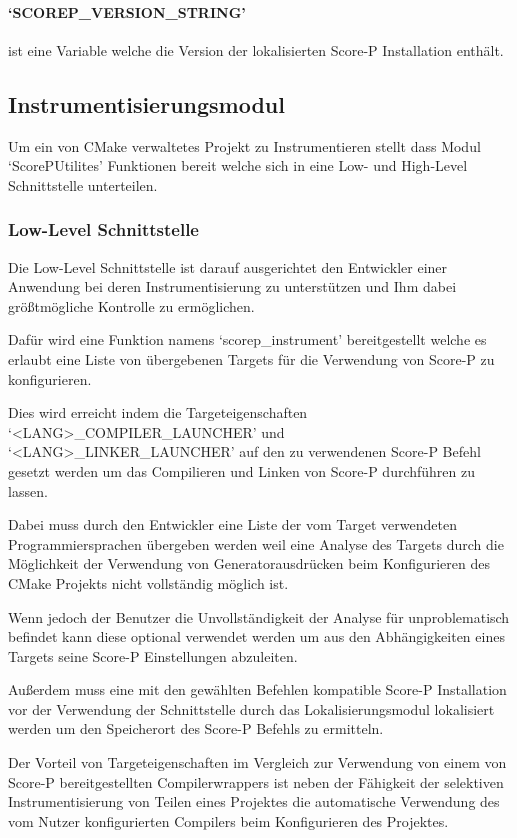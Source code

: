 \documentclass[german,proseminar,hyperref,utf8]{zihpub}
\begin{document}
    \paragraph{`SCOREP\_VERSION\_STRING'} ist eine Variable welche die Version der lokalisierten
    Score-P Installation enthält.

    \subsection{Instrumentisierungsmodul}
    Um ein von CMake verwaltetes Projekt zu Instrumentieren stellt dass Modul `ScorePUtilites'
    Funktionen bereit welche sich in eine Low- und High-Level Schnittstelle unterteilen.

    \subsubsection{Low-Level Schnittstelle}
    Die Low-Level Schnittstelle ist darauf ausgerichtet den Entwickler einer Anwendung bei deren
    Instrumentisierung zu unterstützen und Ihm dabei grö{\ss}tmögliche Kontrolle zu ermöglichen.

    Dafür wird eine Funktion namens `scorep\_instrument' bereitgestellt welche es erlaubt eine Liste
    von übergebenen Targets für die Verwendung von Score-P zu konfigurieren.

    Dies wird erreicht indem die Targeteigenschaften `<LANG>\_COMPILER\_LAUNCHER' und
    `<LANG>\_LINKER\_LAUNCHER' auf den zu verwendenen Score-P Befehl gesetzt werden um
    das Compilieren und Linken von Score-P durchführen zu lassen.

    Dabei muss durch den Entwickler eine Liste der vom Target verwendeten Programmiersprachen übergeben
    werden weil eine Analyse des Targets durch die Möglichkeit der Verwendung von Generatorausdrücken 
    beim Konfigurieren des CMake Projekts nicht vollständig möglich ist.

    Wenn jedoch der Benutzer die Unvollständigkeit der Analyse für unproblematisch befindet
    kann diese optional verwendet werden um aus den Abhängigkeiten eines Targets seine Score-P
    Einstellungen abzuleiten.

    Au{\ss}erdem muss eine mit den gewählten Befehlen kompatible Score-P Installation vor der Verwendung
    der Schnittstelle durch das Lokalisierungsmodul lokalisiert werden um den Speicherort des
    Score-P Befehls zu ermitteln.

    Der Vorteil von Targeteigenschaften im Vergleich zur Verwendung von einem von Score-P bereitgestellten
    Compilerwrappers ist neben der Fähigkeit der selektiven Instrumentisierung von Teilen eines Projektes
    die automatische Verwendung des vom Nutzer konfigurierten Compilers beim Konfigurieren des Projektes.
\end{document}
